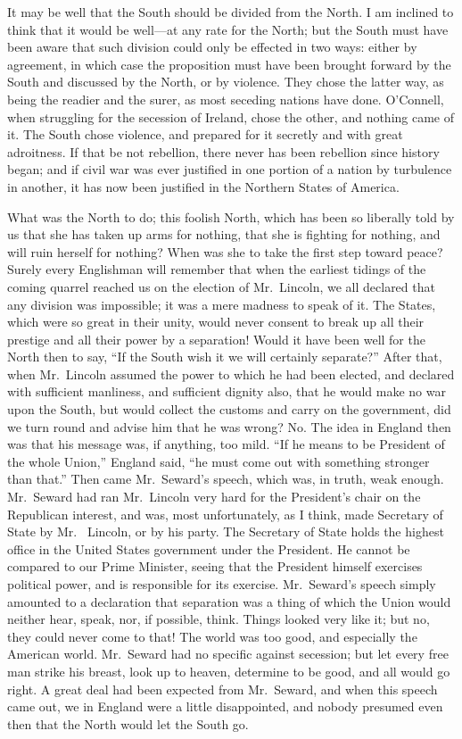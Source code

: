 It may be well that the South should be divided from the North.  I
am inclined to think that it would be well---at any rate for the
North; but the South must have been aware that such division could
only be effected in two ways: either by agreement, in which case
the proposition must have been brought forward by the South and
discussed by the North, or by violence.  They chose the latter way,
as being the readier and the surer, as most seceding nations have
done.  O'Connell, when struggling for the secession of Ireland,
chose the other, and nothing came of it.  The South chose violence,
and prepared for it secretly and with great adroitness.  If that be
not rebellion, there never has been rebellion since history began;
and if civil war was ever justified in one portion of a nation by
turbulence in another, it has now been justified in the Northern
States of America.

What was the North to do; this foolish North, which has been so
liberally told by us that she has taken up arms for nothing, that
she is fighting for nothing, and will ruin herself for nothing?
When was she to take the first step toward peace?  Surely every
Englishman will remember that when the earliest tidings of the
coming quarrel reached us on the election of Mr.\ Lincoln, we all
declared that any division was impossible; it was a mere madness to
speak of it.  The States, which were so great in their unity, would
never consent to break up all their prestige and all their power by
a separation!  Would it have been well for the North then to say,
``If the South wish it we will certainly separate?''  After that,
when Mr.\ Lincoln assumed the power to which he had been elected,
and declared with sufficient manliness, and sufficient dignity
also, that he would make no war upon the South, but would collect
the customs and carry on the government, did we turn round and
advise him that he was wrong?  No.  The idea in England then was
that his message was, if anything, too mild.  ``If he means to be
President of the whole Union,'' England said, ``he must come out with
something stronger than that.''  Then came Mr.\ Seward's speech,
which was, in truth, weak enough.  Mr.\ Seward had ran Mr.\ Lincoln
very hard for the President's chair on the Republican interest, and
was, most unfortunately, as I think, made Secretary of State by Mr.\ %
Lincoln, or by his party.  The Secretary of State holds the highest
office in the United States government under the President.  He
cannot be compared to our Prime Minister, seeing that the President
himself exercises political power, and is responsible for its
exercise.  Mr.\ Seward's speech simply amounted to a declaration
that separation was a thing of which the Union would neither hear,
speak, nor, if possible, think.  Things looked very like it; but
no, they could never come to that!  The world was too good, and
especially the American world.  Mr.\ Seward had no specific against
secession; but let every free man strike his breast, look up to
heaven, determine to be good, and all would go right.  A great deal
had been expected from Mr.\ Seward, and when this speech came out,
we in England were a little disappointed, and nobody presumed even
then that the North would let the South go.

